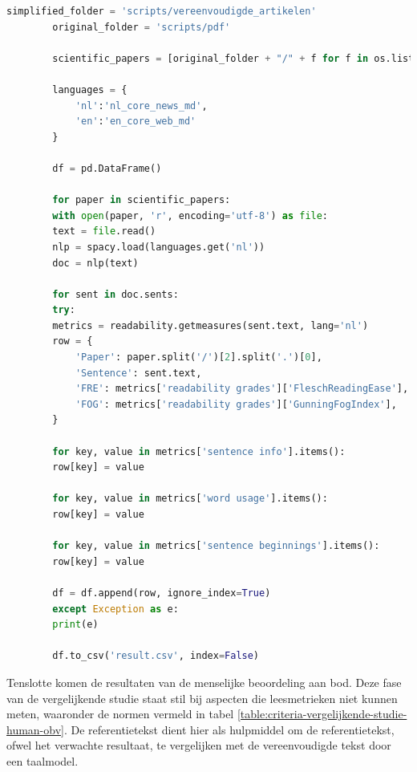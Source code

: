 \begin{center}
	\begin{lstlisting}[language=Python, caption={Script voor fase 4 van de vergelijkende studie}, label={code:verg-studie-phase-4}]	
		simplified_folder = 'scripts/vereenvoudigde_artikelen'
		original_folder = 'scripts/pdf'
		
		scientific_papers = [original_folder + "/" + f for f in os.listdir(original_folder)] + [simplified_folder + "/" + f for f in os.listdir(simplified_folder)]
		
		languages = {
			'nl':'nl_core_news_md',
			'en':'en_core_web_md'
		}
		
		df = pd.DataFrame()
		
		for paper in scientific_papers:
		with open(paper, 'r', encoding='utf-8') as file:
		text = file.read()
		nlp = spacy.load(languages.get('nl'))
		doc = nlp(text)
		
		for sent in doc.sents:
		try:
		metrics = readability.getmeasures(sent.text, lang='nl')
		row = {
			'Paper': paper.split('/')[2].split('.')[0],
			'Sentence': sent.text,
			'FRE': metrics['readability grades']['FleschReadingEase'],
			'FOG': metrics['readability grades']['GunningFogIndex'],
		}
		
		for key, value in metrics['sentence info'].items():
		row[key] = value
		
		for key, value in metrics['word usage'].items():
		row[key] = value
		
		for key, value in metrics['sentence beginnings'].items():
		row[key] = value
		
		df = df.append(row, ignore_index=True)
		except Exception as e:
		print(e)
		
		df.to_csv('result.csv', index=False)
	\end{lstlisting}
\end{center}


Tenslotte komen de resultaten van de menselijke beoordeling aan bod. Deze fase van de vergelijkende studie staat stil bij aspecten die leesmetrieken niet kunnen meten, waaronder de normen vermeld in tabel \ref{table:criteria-vergelijkende-studie-human-obv}. De referentietekst dient hier als hulpmiddel om de referentietekst, ofwel het verwachte resultaat, te vergelijken met de vereenvoudigde tekst door een taalmodel. 

